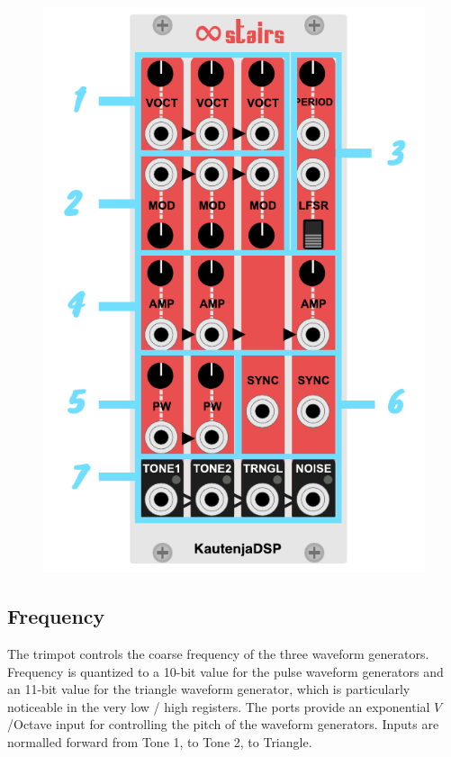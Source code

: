\documentclass[12pt,letter]{article}
\begin{document}
\begin{figure}[!htp]
\centering
\includegraphics{img/Interface}
\end{figure}

\subsection{Frequency}

The trimpot controls the coarse frequency of the three waveform generators. Frequency is quantized to a 10-bit value for the pulse waveform generators and an 11-bit value for the triangle waveform generator, which is particularly noticeable in the very low / high registers. The ports provide an exponential $V$/Octave input for controlling the pitch of the waveform generators. Inputs are normalled forward from Tone 1, to Tone 2, to Triangle.
\end{document}
